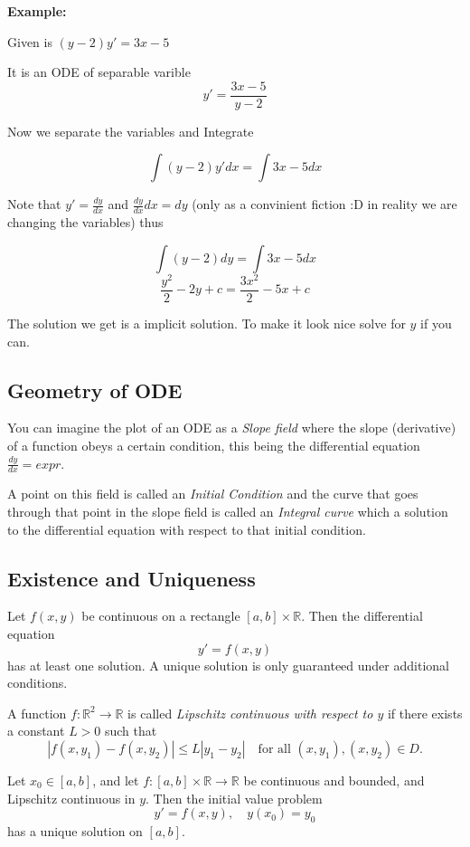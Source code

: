 \textbf{Example:}

Given is \((y - 2)y' = 3x - 5\)

It is an ODE of separable varible
\[y' = \frac{3x - 5}{y - 2}\]

Now we separate the variables and Integrate

\[\int (y - 2)y' dx = \int 3x - 5 dx\]

Note that \(y' = \frac{dy}{dx}\) and \( \frac{dy}{dx} dx = dy\) (only as a convinient fiction :D 
in reality we are changing the variables) thus

\[\int (y - 2)dy = \int 3x - 5 dx\]
\[\frac{y^2}{2} - 2y + c = \frac{3x^2}{2} - 5x + c\]

The solution we get is a implicit solution. To make it look nice solve for \(y\)
if you can.

\subsection{Geometry of ODE}

You can imagine the plot of an ODE as a \emph{Slope field} where the slope (derivative) of a function
obeys a certain condition, this being the differential equation \(\frac{dy}{dx} = expr\).

A point on this field is called an \emph{Initial Condition} and the curve that goes through
that point in the slope field is called an \emph{Integral curve} which a solution to the differential
equation with respect to that initial condition.

\subsection{Existence and Uniqueness}

Let \( f(x, y) \) be continuous on a rectangle \( [a, b] \times \mathbb{R} \). Then the differential equation
\[
y' = f(x, y)
\]
has at least one solution. A unique solution is only guaranteed under additional conditions.

A function \( f : \mathbb{R}^2 \to \mathbb{R} \) is called \emph{Lipschitz continuous with respect to \( y \)} if there exists a constant \( L > 0 \) such that
\[
|f(x, y_1) - f(x, y_2)| \leq L |y_1 - y_2|
\quad \text{for all } (x, y_1), (x, y_2) \in D.
\]

Let \( x_0 \in [a, b] \), and let \( f : [a, b] \times \mathbb{R} \to \mathbb{R} \) be continuous and bounded, and Lipschitz continuous in \( y \). Then the initial value problem
\[
y' = f(x, y), \quad y(x_0) = y_0
\]
has a unique solution on \( [a, b] \).

